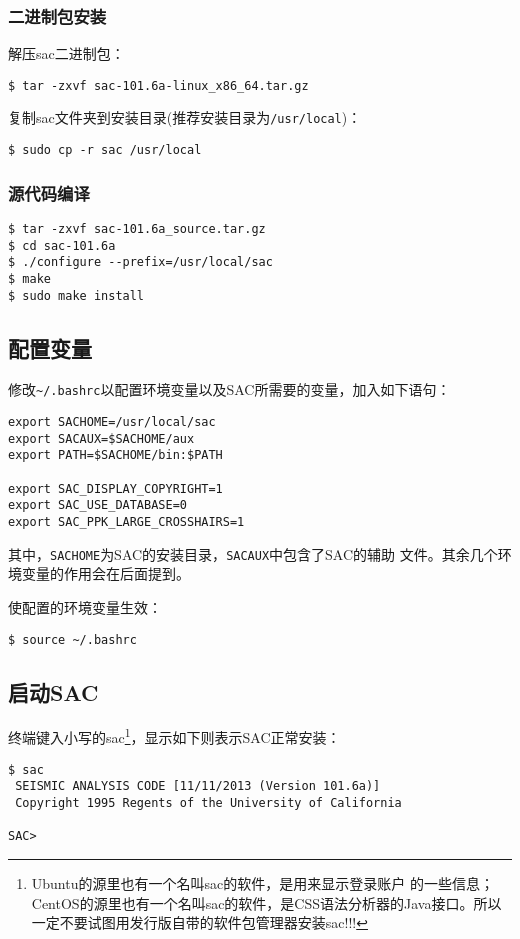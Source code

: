 \subsubsection*{二进制包安装}
解压sac二进制包：
\begin{lstlisting}[style=Shell]
$ tar -zxvf sac-101.6a-linux_x86_64.tar.gz
\end{lstlisting}

复制sac文件夹到安装目录(推荐安装目录为\lstinline{/usr/local})：
\begin{lstlisting}[style=Shell]
$ sudo cp -r sac /usr/local
\end{lstlisting}

\subsubsection*{源代码编译}
\begin{lstlisting}[style=Shell]
$ tar -zxvf sac-101.6a_source.tar.gz
$ cd sac-101.6a
$ ./configure --prefix=/usr/local/sac
$ make
$ sudo make install
\end{lstlisting}

\subsection*{配置变量}
修改\lstinline{~/.bashrc}以配置环境变量以及SAC所需要的变量，加入如下语句：
\begin{lstlisting}[style=Bash]
export SACHOME=/usr/local/sac
export SACAUX=$SACHOME/aux
export PATH=$SACHOME/bin:$PATH

export SAC_DISPLAY_COPYRIGHT=1                                                   
export SAC_USE_DATABASE=0                                                        
export SAC_PPK_LARGE_CROSSHAIRS=1
\end{lstlisting}

其中，\lstinline{SACHOME}为SAC的安装目录，\lstinline{SACAUX}中包含了SAC的辅助
文件。其余几个环境变量的作用会在后面提到。

使配置的环境变量生效：
\begin{lstlisting}[style=Shell]
$ source ~/.bashrc
\end{lstlisting}

\subsection*{启动SAC}
终端键入小写的sac\footnote{Ubuntu的源里也有一个名叫sac的软件，是用来显示登录账户
的一些信息；CentOS的源里也有一个名叫sac的软件，是CSS语法分析器的Java接口。所以
一定不要试图用发行版自带的软件包管理器安装sac!!!}，显示如下则表示SAC正常安装：
\begin{lstlisting}[style=Shell]
$ sac
 SEISMIC ANALYSIS CODE [11/11/2013 (Version 101.6a)]
 Copyright 1995 Regents of the University of California

SAC> 
\end{lstlisting}
